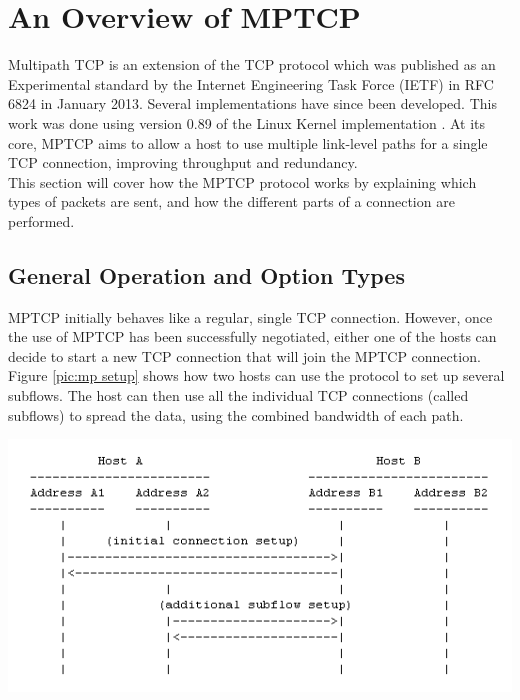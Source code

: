 

\chapter{An Overview of MPTCP} \label{chap:mptcp}
Multipath TCP is an extension of the TCP protocol which was published as an Experimental standard by the Internet Engineering Task Force (IETF) in RFC 6824 \cite{rfc6824} in January 2013. Several implementations have since been developed. This work was done using version 0.89 of the Linux Kernel implementation \cite{mptcp}. At its core, MPTCP aims to allow a host to use multiple link-level paths for a single TCP connection, improving throughput and redundancy.\\

This section will cover how the MPTCP protocol works by explaining which types of packets are sent, and how the different parts of a connection are performed.

\section{General Operation and Option Types}
MPTCP initially behaves like a regular, single TCP connection. However, once the use of MPTCP has been successfully negotiated, either one of the hosts can decide to start a new TCP connection that will join the MPTCP connection. Figure \ref{pic:mp setup} shows how two hosts can use the protocol to set up several subflows. The host can then use all the individual TCP connections (called subflows) to spread the data, using the combined bandwidth of each path.\\

\begin{minipage}[c]{\textwidth}
\centering
\includegraphics[scale=0.6]{Figures/mptcpsetup.png}
\label{pic:mp setup}
\end{minipage} \\

